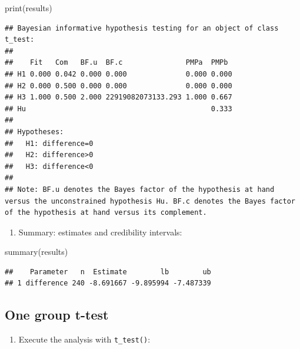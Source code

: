 \documentclass[
]{book}
\newenvironment{Shaded}{\begin{snugshade}}{\end{snugshade}}
\newcommand{\CommentTok}[1]{\textcolor[rgb]{0.56,0.35,0.01}{\textit{#1}}}
\newcommand{\FunctionTok}[1]{\textcolor[rgb]{0.00,0.00,0.00}{#1}}
\newcommand{\NormalTok}[1]{#1}
\newcommand{\OtherTok}[1]{\textcolor[rgb]{0.56,0.35,0.01}{#1}}
\newcommand{\SpecialCharTok}[1]{\textcolor[rgb]{0.00,0.00,0.00}{#1}}
\providecommand{\tightlist}{%
  \setlength{\itemsep}{0pt}\setlength{\parskip}{0pt}}
\begin{document}
\begin{Shaded}
\begin{Highlighting}[]
\FunctionTok{print}\NormalTok{(results)}
\end{Highlighting}
\end{Shaded}

\begin{verbatim}
## Bayesian informative hypothesis testing for an object of class t_test:
## 
##    Fit   Com   BF.u  BF.c               PMPa  PMPb 
## H1 0.000 0.042 0.000 0.000              0.000 0.000
## H2 0.000 0.500 0.000 0.000              0.000 0.000
## H3 1.000 0.500 2.000 22919082073133.293 1.000 0.667
## Hu                                            0.333
## 
## Hypotheses:
##   H1: difference=0
##   H2: difference>0
##   H3: difference<0
## 
## Note: BF.u denotes the Bayes factor of the hypothesis at hand versus the unconstrained hypothesis Hu. BF.c denotes the Bayes factor of the hypothesis at hand versus its complement.
\end{verbatim}

\begin{enumerate}
\def\labelenumi{\arabic{enumi})}
\setcounter{enumi}{3}
\tightlist
\item
  Summary: estimates and credibility intervals:
\end{enumerate}

\begin{Shaded}
\begin{Highlighting}[]
\FunctionTok{summary}\NormalTok{(results)}
\end{Highlighting}
\end{Shaded}

\begin{verbatim}
##    Parameter   n  Estimate        lb        ub
## 1 difference 240 -8.691667 -9.895994 -7.487339
\end{verbatim}

\hypertarget{one-group-t-test}{%
\subsection{One group t-test}\label{one-group-t-test}}

\begin{enumerate}
\def\labelenumi{\arabic{enumi})}
\tightlist
\item
  Execute the analysis with \texttt{t\_test()}:
\end{enumerate}

\begin{Shaded}
\end{Shaded}
\end{document}
